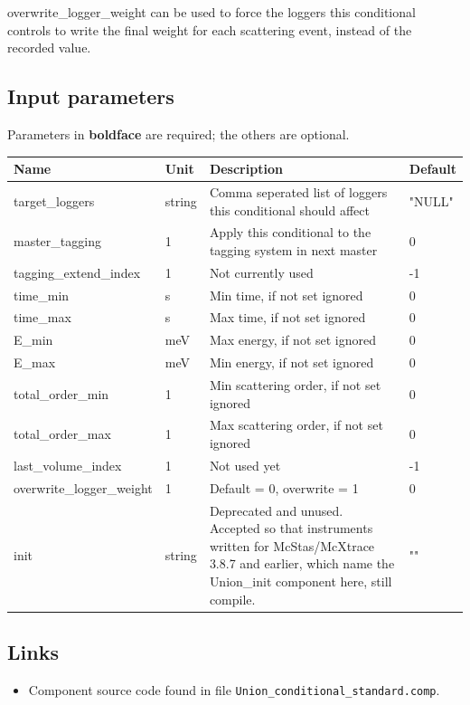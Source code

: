 overwrite\_logger\_weight can be used to force the loggers this conditional controls to write the final weight for each scattering event, instead of the recorded value.

\subsection*{Input parameters}
Parameters in \textbf{boldface} are required; the others are optional.

\begin{longtable}{p{}p{}p{}p{}}
\toprule
\textbf{Name} & \textbf{Unit} & \textbf{Description} & \textbf{Default} \\
\midrule
\endhead
target\_loggers & string & Comma seperated list of loggers this conditional should affect & "NULL" \\
master\_tagging & 1 & Apply this conditional to the tagging system in next master & 0 \\
tagging\_extend\_index & 1 & Not currently used & -1 \\
time\_min & s & Min time, if not set ignored & 0 \\
time\_max & s & Max time, if not set ignored & 0 \\
E\_min & meV & Max energy, if not set ignored & 0 \\
E\_max & meV & Min energy, if not set ignored & 0 \\
total\_order\_min & 1 & Min scattering order, if not set ignored & 0 \\
total\_order\_max & 1 & Max scattering order, if not set ignored & 0 \\
last\_volume\_index & 1 & Not used yet & -1 \\
overwrite\_logger\_weight & 1 & Default = 0, overwrite = 1 & 0 \\
init & string & Deprecated and unused. Accepted so that instruments written for McStas/McXtrace 3.8.7 and earlier, which name the Union\_init component here, still compile. & "" \\
\bottomrule
\end{longtable}

\subsection*{Links}
\begin{itemize}
  \item Component source code found in file \texttt{Union\_conditional\_standard.comp}.
\end{itemize}
